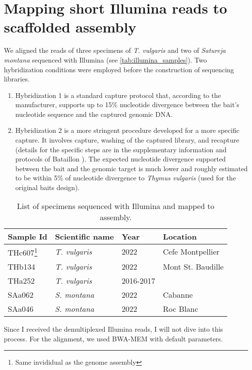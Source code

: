 \section{Mapping short Illumina reads to scaffolded assembly}\label{sec:illumina}

We aligned the reads of three specimens of \textit{T. vulgaris} and two of \textit{Satureja montana} sequenced with Illumina (see \autoref{tab:illumina_samples}). Two hybridization conditions were employed before the construction of sequencing libraries.\\

\begin{enumerate}
    \item Hybridization 1 is a standard capture protocol that, according to the manufacturer, supports up to 15\% nucleotide divergence between the bait's nucleotide sequence and the captured genomic DNA. 
    \item Hybridization 2 is a more stringent procedure developed for a more specific capture. It involves capture, washing of the captured library, and recapture (details for the specific steps are in the supplementary information and protocols of Bataillon \etal \cite{bataillonGenotypePhenotypeGenetic2022}). The expected nucleotide divergence supported between the bait and the genomic target is much lower and roughly estimated to be within 5\% of nucleotide divergence to \textit{Thymus vulgaris} (used for the original baits design).
\end{enumerate} 

\begin{table}[h!]
    \begin{minipage}{\linewidth}
    \renewcommand\thefootnote{\thempfootnote}
    \centering
    \begin{tabular}{@{}llll@{}}
    \toprule
    Sample Id & Scientific name                      & Year & Location     \\ \midrule
    THc607\footnote{Same invididual as the genome assembly}    & \textit{T. vulgaris}                          & 2022   &  Cefe Montpellier  \\
    THb134    & \textit{T. vulgaris}                 & 2022  & Mont St. Baudille   \\
    THa252    & \textit{T. vulgaris}                 & 2016-2017 & \\
    SAa062    & \textit{S. montana} & 2022 & Cabanne     \\
    SAa046    & \textit{S. montana} & 2022  & Roc Blanc    \\ \bottomrule
    \end{tabular}
    \caption{List of specimens sequenced with Illumina and mapped to assembly. }
    \label{tab:illumina_samples}
    \end{minipage}
    \end{table}

Since I received the demultiplexed Illumina reads, I will not dive into this process. For the alignment, we used BWA-MEM with default parameters. ~\cite{liAligningSequenceReads2013}

